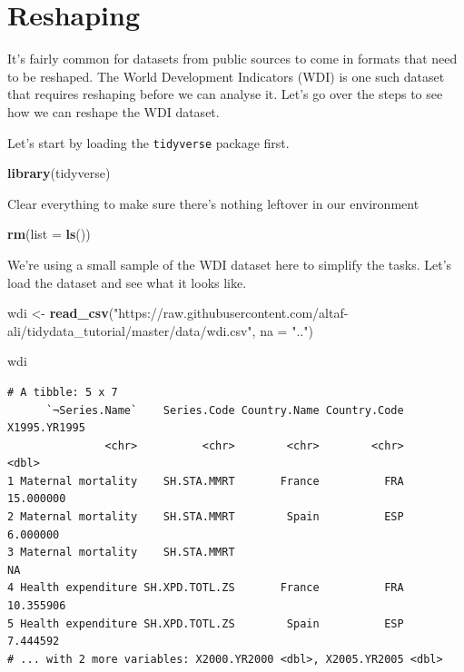 \documentclass[]{article}
\newenvironment{Shaded}{\begin{snugshade}}{\end{snugshade}}
\newcommand{\KeywordTok}[1]{\textcolor[rgb]{0.13,0.29,0.53}{\textbf{{#1}}}}
\newcommand{\DataTypeTok}[1]{\textcolor[rgb]{0.13,0.29,0.53}{{#1}}}
\newcommand{\StringTok}[1]{\textcolor[rgb]{0.31,0.60,0.02}{{#1}}}
\newcommand{\NormalTok}[1]{{#1}}
\theoremstyle{definition}
\theoremstyle{definition}
\theoremstyle{definition}
\theoremstyle{remark}
\begin{document}
\section{Reshaping}\label{reshaping}

It's fairly common for datasets from public sources to come in formats
that need to be reshaped. The World Development Indicators (WDI) is one
such dataset that requires reshaping before we can analyse it. Let's go
over the steps to see how we can reshape the WDI dataset.

Let's start by loading the \texttt{tidyverse} package first.

\begin{Shaded}
\begin{Highlighting}[]
\KeywordTok{library}\NormalTok{(tidyverse)}
\end{Highlighting}
\end{Shaded}

Clear everything to make sure there's nothing leftover in our
environment

\begin{Shaded}
\begin{Highlighting}[]
\KeywordTok{rm}\NormalTok{(}\DataTypeTok{list =} \KeywordTok{ls}\NormalTok{())}
\end{Highlighting}
\end{Shaded}

We're using a small sample of the WDI dataset here to simplify the
tasks. Let's load the dataset and see what it looks like.

\begin{Shaded}
\begin{Highlighting}[]
\NormalTok{wdi <-}\StringTok{ }\KeywordTok{read_csv}\NormalTok{(}\StringTok{"https://raw.githubusercontent.com/altaf-ali/tidydata_tutorial/master/data/wdi.csv"}\NormalTok{, }\DataTypeTok{na =} \StringTok{".."}\NormalTok{)}

\NormalTok{wdi}
\end{Highlighting}
\end{Shaded}

\begin{verbatim}
# A tibble: 5 x 7
      `¬Series.Name`    Series.Code Country.Name Country.Code X1995.YR1995
               <chr>          <chr>        <chr>        <chr>        <dbl>
1 Maternal mortality    SH.STA.MMRT       France          FRA    15.000000
2 Maternal mortality    SH.STA.MMRT        Spain          ESP     6.000000
3 Maternal mortality    SH.STA.MMRT                                     NA
4 Health expenditure SH.XPD.TOTL.ZS       France          FRA    10.355906
5 Health expenditure SH.XPD.TOTL.ZS        Spain          ESP     7.444592
# ... with 2 more variables: X2000.YR2000 <dbl>, X2005.YR2005 <dbl>
\end{verbatim}
\end{document}

